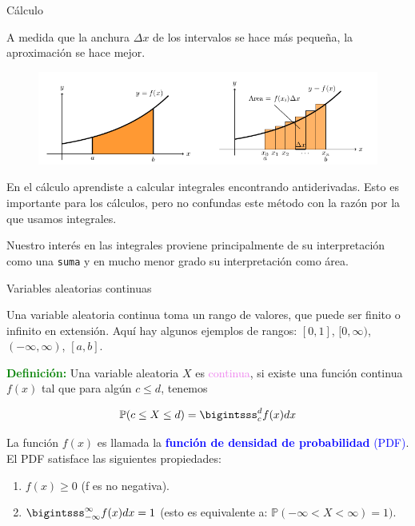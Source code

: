 \documentclass[10pt]{beamer}
\begin{document}
\begin{frame}{C\'alculo}
\small{ 

A medida que la anchura $\Delta x$ de los intervalos se hace m\'as peque\~na, la aproximaci\'on se hace mejor.

\begin{figure}[ht]
	\centering
	\includegraphics[scale=.4]{G1.png}
\end{figure}
	}
	

\vspace{0.4cm}

\scriptsize{En el c\'alculo aprendiste a calcular integrales encontrando antiderivadas. Esto es importante para los c\'alculos, pero no confundas este m\'etodo con la raz\'on por la que usamos integrales.
	
Nuestro inter\'es en las integrales proviene principalmente de su interpretaci\'on como una \texttt{suma} y en mucho menor grado su interpretaci\'on como \'area.}	
\end{frame}

\begin{frame}{Variables aleatorias continuas }
\small{ Una variable aleatoria continua toma un rango de valores, que puede ser finito o infinito en extensi\'on. Aqu\'i hay algunos ejemplos de rangos: $[0, 1]$, $[0, \infty)$, $(-\infty, \infty)$, $[a, b]$.

\textcolor{green}{\textbf{Definici\'on:}} Una variable aleatoria $X$ es \textcolor{violet}{continua}, si existe una funci\'on continua $f(x)$ tal que para alg\'un $c \leq d$, tenemos

\begin{equation}
\mathbb{P}(c \leq X \leq d) = \bigintsss_{c}^{d}f(x)dx
\end{equation}

La funci\'on $f(x)$ es llamada la \textcolor{blue}{\textbf{funci\'on de densidad de probabilidad} (PDF)}. El PDF satisface las siguientes propiedades:

\begin{enumerate}
	\item $f(x) \geq 0$ (f es no negativa).
	\item $\bigintsss_{-\infty}^{\infty}f(x)dx = 1$ \quad (esto es equivalente a: $\mathbb{P}(-\infty < X <  \infty) = 1)$.
\end{enumerate}
	}
\end{frame}
\end{document}
